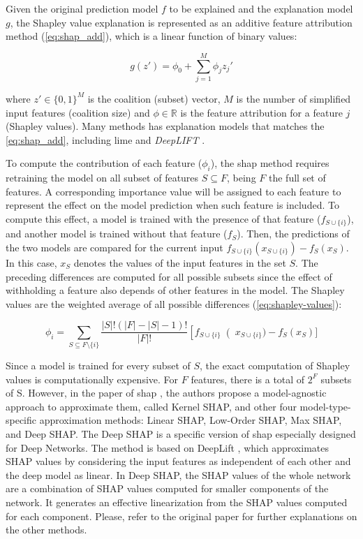Given the original prediction model $f$ to be explained and the explanation model $g$, the Shapley value explanation is represented as an additive feature attribution method (\autoref{eq:shap_add}), which is a linear function of binary values:

\begin{equation}
\label{eq:shap_add}
g(z')=\phi_0+\sum_{j=1}^M\phi_jz_j'
\end{equation}

\noindent
where $z' \in \{0,1\}^M$ is the coalition (subset) vector, $M$ is the number of simplified input features (coalition size) and $\phi \in \mathbb{R}$ is the feature attribution for a feature $j$ (Shapley values). Many methods has explanation models that matches the \autoref{eq:shap_add}, including \acs{lime} \citep{lime} and \textit{DeepLIFT} \citep{deeplift_old, deeplift_new}.

To compute the contribution of each feature ($\phi_i$), the \acs{shap} method requires retraining the model on all subset of features $S \subseteq F$, being $F$ the full set of features. A corresponding importance value will be assigned to each feature to represent the effect on the model prediction when such feature is included. To compute this effect, a model is trained with the presence of that feature ($f_{S \cup \{i\}}$), and another model is trained without that feature ($f_S$). Then, the predictions of the two models are compared for the current input $f_{S \cup \{i\}}(x_{S \cup \{i\}}) - f_S(x_S)$. In this case, $x_S$ denotes the values of the input features in the set $S$. The preceding differences are computed for all possible subsets since the effect of withholding a feature also depends of other features in the model. The Shapley values are the weighted average of all possible differences (\autoref{eq:shapley-values}):

\begin{equation}
\label{eq:shapley-values}
\phi_i = \sum_{S \subseteq F \setminus \{i\}} \frac{\left|S\right|!(\left|F\right| - \left|S\right| - 1)!}{\left|F\right|!}\left[f_{S \cup \{i\}}\right (x_{S \cup \{i\}}) - f_S(x_S)]
\end{equation}

Since a model is trained for every subset of $S$, the exact computation of Shapley values is computationally expensive. For $F$ features, there is a total of $2^F$ subsets of S. However, in the paper of \acs{shap} \citep{shap2018}, the authors propose a model-agnostic approach to approximate them, called Kernel SHAP, and other four model-type-specific approximation methods: Linear SHAP, Low-Order SHAP, Max SHAP, and Deep SHAP. The Deep SHAP is a specific version of \acs{shap} especially designed for Deep Networks. The method is based on DeepLift \citep{deeplift_old, deeplift_new}, which approximates SHAP values by considering the input features as independent of each other and the deep model as linear. In Deep SHAP, the SHAP values of the whole network are a combination of SHAP values computed for smaller components of the network. It generates an effective linearization from the SHAP values computed for each component. Please, refer to the original paper for further explanations on the other methods.

